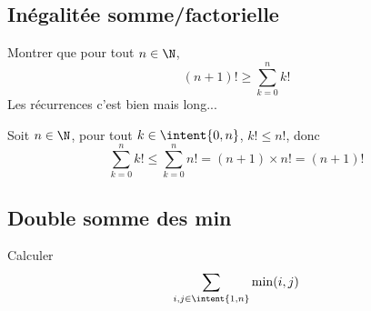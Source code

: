 \subsection{Inégalitée somme/factorielle}

\begin{exercice}
Montrer que pour tout $n\in \N$, $$(n+1)! \geq \sum_{k=0}^n k! $$
\footnotesize{Les récurrences c'est bien mais long...}
\end{exercice}



\begin{correction}
Soit $n\in \N$, pour tout $k\in\intent{0,n} $, $k! \leq n! $, donc 
$$\sum_{k=0}^n k! \leq \sum_{k=0}^n n! = (n+1) \times  n ! =(n+1)!$$
\end{correction}
 
 





\subsection{Double somme des min}

\begin{exercice}
Calculer 
$$\sum_{i,j \in \intent{1,n}} \min(i,j)$$
\end{exercice}


